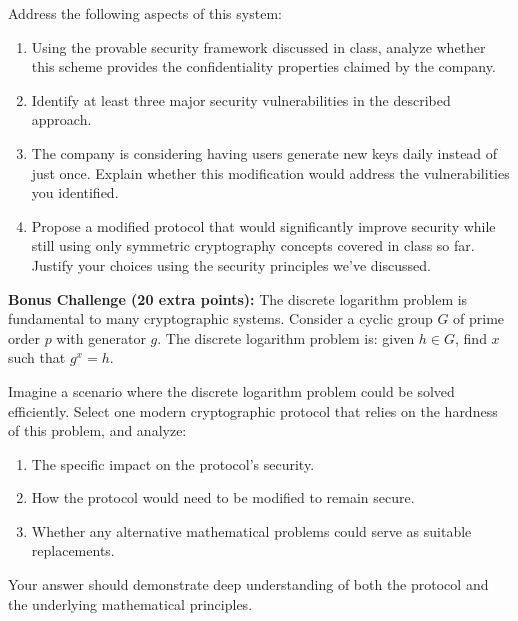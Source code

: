 \documentclass[10pt,a4paper,american]{exam}
\begin{document}
\begin{enumerate}
	      Address the following aspects of this system:
	      \begin{enumerate}
		      \item Using the provable security framework discussed in class, analyze whether this scheme provides the confidentiality properties claimed by the company.
		      \item Identify at least three major security vulnerabilities in the described approach.
		      \item The company is considering having users generate new keys daily instead of just once. Explain whether this modification would address the vulnerabilities you identified.
		      \item Propose a modified protocol that would significantly improve security while still using only symmetric cryptography concepts covered in class so far. Justify your choices using the security principles we've discussed.
	      \end{enumerate}
\end{enumerate}

\begin{tcolorbox}[colframe=EarthBrown!30!white,colback=EarthBrown!5!white]
	\textbf{Bonus Challenge (20 extra points):} The discrete logarithm problem is fundamental to many cryptographic systems. Consider a cyclic group $G$ of prime order $p$ with generator $g$. The discrete logarithm problem is: given $h \in G$, find $x$ such that $g^x = h$.

	Imagine a scenario where the discrete logarithm problem could be solved efficiently. Select one modern cryptographic protocol that relies on the hardness of this problem, and analyze:

	\begin{enumerate}
		\item The specific impact on the protocol's security.
		\item How the protocol would need to be modified to remain secure.
		\item Whether any alternative mathematical problems could serve as suitable replacements.
	\end{enumerate}

	Your answer should demonstrate deep understanding of both the protocol and the underlying mathematical principles.
\end{tcolorbox}
\end{document}
